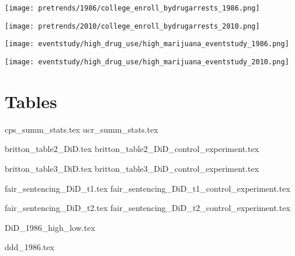 \documentclass{article}
\begin{document}
\texttt{[image: pretrends/1986/college\_enroll\_bydrugarrests\_1986.png]}

\texttt{[image: pretrends/2010/college\_enroll\_bydrugarrests\_2010.png]}

\texttt{[image: eventstudy/high\_drug\_use/high\_marijuana\_eventstudy\_1986.png]}

\texttt{[image: eventstudy/high\_drug\_use/high\_marijuana\_eventstudy\_2010.png]}


\section*{Tables}
{cps_summ_stats.tex}
{ucr_summ_stats.tex}


{britton_table2_DiD.tex}
{britton_table2_DiD_control_experiment.tex}

{britton_table3_DiD.tex}
{britton_table3_DiD_control_experiment.tex}

{fair_sentencing_DiD_t1.tex}
{fair_sentencing_DiD_t1_control_experiment.tex}

{fair_sentencing_DiD_t2.tex}
{fair_sentencing_DiD_t2_control_experiment.tex}

{DiD_1986_high_low.tex}

{ddd_1986.tex}



\clearpage
\nocite{*}
\singlespacing




\clearpage
\end{document}
